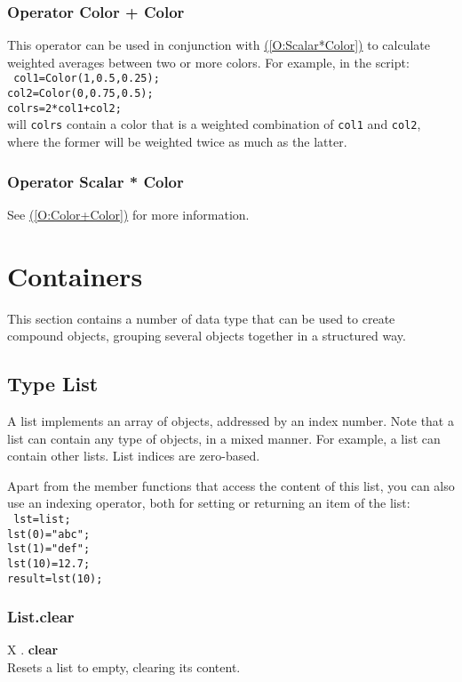 \documentclass[10pt]{book}
\newcommand{\linkitem}[1]{\hyperref[#1]{\nameref{#1} (\ref{#1})}}
\newcommand{\sourcecode}[1]{\texttt{#1}}
\begin{document}
\subsubsection{Operator Color + Color \label{O:Color+Color}}
This operator can be used in conjunction with \linkitem{O:Scalar*Color} to calculate weighted averages between two or more colors.
For example, in the script: \\
\sourcecode{
col1=Color(1,0.5,0.25); \\
col2=Color(0,0.75,0.5); \\
colrs=2*col1+col2; \\
}
will \sourcecode{colrs} contain a color that is a weighted combination of \sourcecode{col1} and \sourcecode{col2}, where the former will be weighted twice as much as the latter.

\subsubsection{Operator Scalar * Color \label{O:Scalar*Color}}
See \linkitem{O:Color+Color} for more information.

\section{Containers \label{Containers}}
This section contains a number of data type that can be used to create compound objects, grouping several objects together in a structured way.

\subsection{Type List \label{T:List}}
A list implements an array of objects, addressed by an index number. Note that a list can contain any type of objects, in a mixed manner. For example, a list can contain other lists. List indices are zero-based.

Apart from the member functions that access the content of this list, you can also use an indexing operator, both for setting or returning an item of the list: \\
\sourcecode{
lst=list; \\
lst(0)="abc"; \\
lst(1)="def"; \\
lst(10)=12.7; \\
result=lst(10);
} \\

\subsubsection{List.clear \label{F:List:clear}}
X . \textbf{clear} \\
Resets a list to empty, clearing its content.
\end{document}
